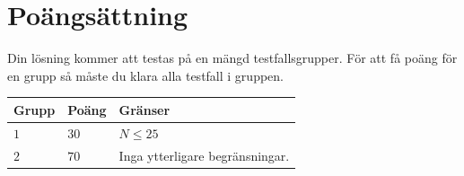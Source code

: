 \section*{Poängsättning}
Din lösning kommer att testas på en mängd testfallsgrupper.
För att få poäng för en grupp så måste du klara alla testfall i gruppen.

\noindent
\begin{tabular}{| l | l | p{12cm} |}
  \hline
  \textbf{Grupp} & \textbf{Poäng} & \textbf{Gränser} \\ \hline
  $1$    & $30$       & $N \leq 25$ \\ \hline
  $2$    & $70$       & Inga ytterligare begränsningar. \\ \hline
\end{tabular}
